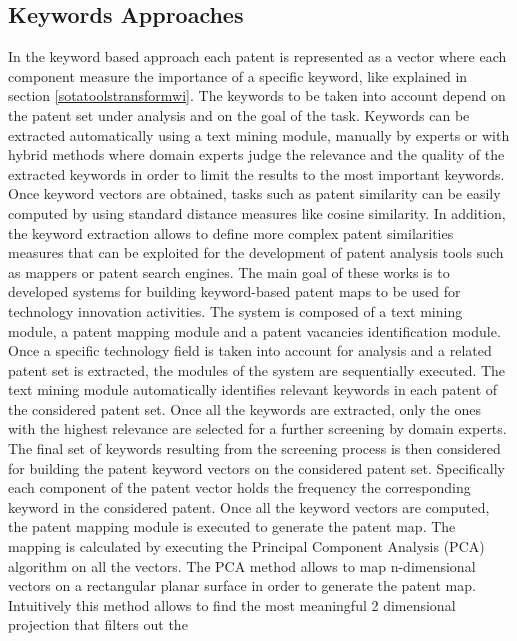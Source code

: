 \documentclass[]{book}
\begin{document}
\subsection{Keywords Approaches}\label{keywords-approaches}

In the keyword based approach each patent is represented as a vector
where each component measure the importance of a specific keyword, like
explained in section \ref{sotatoolstransformwi}. The keywords to be
taken into account depend on the patent set under analysis and on the
goal of the task. Keywords can be extracted automatically using a text
mining module, manually by experts or with hybrid methods where domain
experts judge the relevance and the quality of the extracted keywords in
order to limit the results to the most important keywords. Once keyword
vectors are obtained, tasks such as patent similarity can be easily
computed by using standard distance measures like cosine similarity. In
addition, the keyword extraction allows to define more complex patent
similarities measures \citep{moehrle2010measures} that can be exploited
for the development of patent analysis tools
\citep[\citet{lee2015novelty}]{lee2009approach} such as mappers or
patent search engines. The main goal of these works is to developed
systems for building keyword-based patent maps to be used for technology
innovation activities. The system is composed of a text mining module, a
patent mapping module and a patent vacancies identification module. Once
a specific technology field is taken into account for analysis and a
related patent set is extracted, the modules of the system are
sequentially executed. The text mining module automatically identifies
relevant keywords in each patent of the considered patent set. Once all
the keywords are extracted, only the ones with the highest relevance are
selected for a further screening by domain experts. The final set of
keywords resulting from the screening process is then considered for
building the patent keyword vectors on the considered patent set.
Specifically each component of the patent vector holds the frequency the
corresponding keyword in the considered patent. Once all the keyword
vectors are computed, the patent mapping module is executed to generate
the patent map. The mapping is calculated by executing the Principal
Component Analysis (PCA) algorithm on all the vectors. The PCA method
allows to map n-dimensional vectors on a rectangular planar surface in
order to generate the patent map. Intuitively this method allows to find
the most meaningful 2 dimensional projection that filters out the
\end{document}
